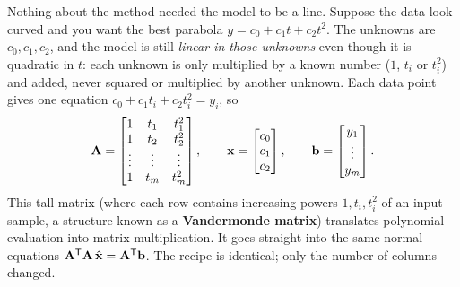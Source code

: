 Nothing about the method needed the model to be a line. Suppose the data look curved and you want
the best parabola $y=c_0+c_1 t+c_2 t^2$. The unknowns are $c_0,c_1,c_2$, and the model
is still \emph{linear in those unknowns} even though it is quadratic in $t$: each unknown is only
multiplied by a known number ($1$, $t_i$ or $t_i^2$) and added, never squared or multiplied by
another unknown. Each data point gives
one equation $c_0+c_1 t_i + c_2 t_i^2 = y_i$, so
\[
  \mathbf{A}=\begin{bmatrix}
    1 & t_1 & t_1^2\\
    1 & t_2 & t_2^2\\
    \vdots & \vdots & \vdots\\
    1 & t_m & t_m^2
  \end{bmatrix},
  \qquad
  \mathbf{x}=\begin{bmatrix}c_0\\c_1\\c_2\end{bmatrix},
  \qquad
  \mathbf{b}=\begin{bmatrix}y_1\\\vdots\\y_m\end{bmatrix}.
\]
This tall matrix (where each row contains increasing powers $1, t_i, t_i^2$ of an input sample,
a structure known as a \textbf{Vandermonde matrix}) translates polynomial evaluation into matrix
multiplication. It goes straight into the same normal equations
$\mathbf{A}^{\mathsf{T}}\mathbf{A}\,\hat{\mathbf{x}}=\mathbf{A}^{\mathsf{T}}\mathbf{b}$. The recipe is identical; only the number of
columns changed.

